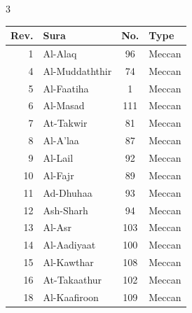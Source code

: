\documentclass{article}
\begin{document}
\begin{center}
    \small
    \setlength{\tabcolsep}{3pt}
    \renewcommand{\arraystretch}{0.85}
    \begin{multicols}{3}

        \begin{threeparttable}
            \begin{tabular}{@{}r l c l@{}}
                \textbf{Rev.} & \textbf{Sura}         & \textbf{No.} & \textbf{Type} \\
                \hline
                1             & Al-Alaq               & 96           & Meccan        \\
                4             & Al-Muddaththir        & 74           & Meccan        \\
                5             & Al-Faatiha            & 1            & Meccan        \\
                6             & Al-Masad              & 111          & Meccan        \\
                7             & At-Takwir             & 81           & Meccan        \\
                8             & Al-A'laa              & 87           & Meccan        \\
                9             & Al-Lail               & 92           & Meccan        \\
                10            & Al-Fajr               & 89           & Meccan        \\
                11            & Ad-Dhuhaa             & 93           & Meccan        \\
                12            & Ash-Sharh             & 94           & Meccan        \\
                13            & Al-Asr                & 103          & Meccan        \\
                14            & Al-Aadiyaat           & 100          & Meccan        \\
                15            & Al-Kawthar            & 108          & Meccan        \\
                16            & At-Takaathur          & 102          & Meccan        \\
                18            & Al-Kaafiroon          & 109          & Meccan        \\

\end{tabular}
\end{threeparttable}
\end{multicols}
\end{center}
\end{document}
